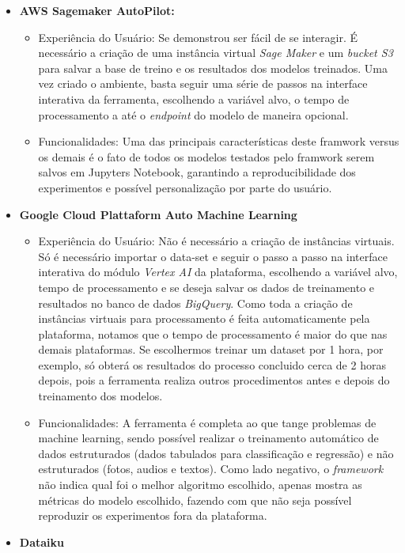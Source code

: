 \documentclass[9pt, a4paper, twocolumn]{article}
\begin{document}
\begin{itemize}
\item
  \textbf{AWS Sagemaker AutoPilot:}

  \begin{itemize}
  \item
    Experiência do Usuário: Se demonstrou ser fácil de se interagir. É necessário a criação de uma instância virtual \emph{Sage Maker} e um \emph{bucket S3} para salvar a base de treino e os resultados dos modelos treinados. Uma vez criado o ambiente, basta seguir uma série de passos na interface interativa da ferramenta, escolhendo a variável alvo, o tempo de processamento a até o \emph{endpoint} do modelo de maneira opcional.
  \item
    Funcionalidades: Uma das principais características deste framwork versus os demais é o fato de todos os modelos testados pelo framwork serem salvos em Jupyters Notebook, garantindo a reproducibilidade dos experimentos e possível personalização por parte do usuário.
  \end{itemize}
\item
  \textbf{Google Cloud Plattaform Auto Machine Learning}

  \begin{itemize}
  \item
    Experiência do Usuário: Não é necessário a criação de instâncias virtuais. Só é necessário importar o data-set e seguir o passo a passo na interface interativa do módulo \emph{Vertex AI} da plataforma, escolhendo a variável alvo, tempo de processamento e se deseja salvar os dados de treinamento e resultados no banco de dados \emph{BigQuery}. Como toda a criação de instâncias virtuais para processamento é feita automaticamente pela plataforma, notamos que o tempo de processamento é maior do que nas demais plataformas. Se escolhermos treinar um dataset por 1 hora, por exemplo, só obterá os resultados do processo concluido cerca de 2 horas depois, pois a ferramenta realiza outros procedimentos antes e depois do treinamento dos modelos.
  \item
    Funcionalidades: A ferramenta é completa ao que tange problemas de machine learning, sendo possível realizar o treinamento automático de dados estruturados (dados tabulados para classificação e regressão) e não estruturados (fotos, audios e textos). Como lado negativo, o \emph{framework} não indica qual foi o melhor algoritmo escolhido, apenas mostra as métricas do modelo escolhido, fazendo com que não seja possível reproduzir os experimentos fora da plataforma.
  \end{itemize}
\item
  \textbf{Dataiku}


\end{itemize}
\end{document}
